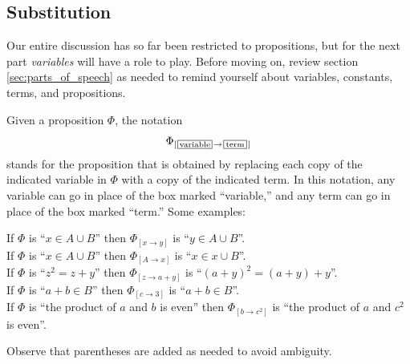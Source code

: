 \documentclass[12pt]{article}
\newcommand{\SUBST}[3]{{#1}_{[{#2}\rightarrow{#3}]}}
\newcounter{exercise}
\newcounter{rule}
\newcommand{\indented}[1]{\begin{adjustwidth}{1em}{}#1\end{adjustwidth}}
\def\pA{\Phi}
\begin{document}








\subsection{Substitution}
\label{sec:subst}

Our entire discussion has so far been restricted to propositions, but for the next part \emph{variables} will have a role to play.
Before moving on, review section
\ref{sec:parts_of_speech} as needed to remind yourself about variables, constants, terms, and propositions.

\newcommand{\eg}[4]{If $\pA$ is ``#1'' then $\SUBST{\pA}{#2}{#3}$ is ``#4''.}
\def\lsp{\\[0.4em]}

\newcommand{\boxsubscript}[2]{\,\raisebox{-1.5pt}{\framebox(#1,7){\scriptsize {#2}}}\,}
\def\SUBSTtemplate{\SUBST{\pA}{\boxsubscript{30}{variable}}{\boxsubscript{20}{term}}}

Given a proposition $\pA$, the notation
$$
\SUBSTtemplate{}
$$
stands for the proposition that is obtained by replacing each copy of the indicated variable in $\pA$ with a copy of
the indicated term.
In this notation, any variable can go in place of the box marked ``variable,'' and any term can go in place of the box
marked ``term.''
Some examples:
\indented{
\eg{$x\in A\cup B$}{x}{y}{$y\in A\cup B$}\lsp
\eg{$x\in A\cup B$}{A}{x}{$x\in x\cup B$}\lsp
\eg{$z^2=z+y$}{z}{a+y}{$(a+y)^2=(a+y)+y$}\lsp
\eg{$a+b\in B$}{c}{3}{$a+b\in B$}\lsp
\eg{the product of $a$ and $b$ is even}{b}{c^2}{the product of $a$ and $c^2$ is even}
}
Observe that parentheses are added as needed to avoid ambiguity.
\end{document}
